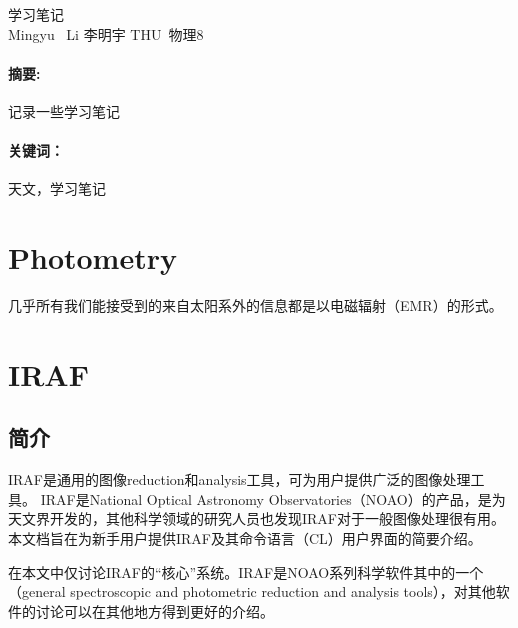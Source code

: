 \documentclass[CJK, utf8, GBK, oneside, a4paper, 12pt]{ctexart}
\newcommand{\myfiguresetwidthfilecaplabel}[4]{
    \centering
    \texttt{[image: ./images/\#2]}
    \captionsetup{font={footnotesize}}
    \caption{#3}
    \label{#4} }
\renewenvironment*{abstract}[1]{%
\newcommand\gjc{#1}
\paragraph{摘要:}
}{\paragraph{关键词：}\gjc }
\newcommand{\rd}{\mathrm{d}}
\newcommand{\dps}[1]{\displaystyle{#1}}
\begin{document}



\renewcommand\appendix{\setcounter{secnumdepth}{-2}}



\begin{center}
    \heiti{}学习笔记\\
    \kaishu{}Mingyu \ Li \qquad 李明宇 \qquad THU\  物理8
\end{center}

\begin{abstract}{天文，学习笔记}
    记录一些学习笔记
\end{abstract}
\tableofcontents
\newpage
\begin{comment}
\begin{equation}\dps{ v_g=\frac{\rd \omega}{\rd k}=\frac{c}{n+\omega\frac{\rd n}{\rd \omega}}}\end{equation}

\begin{figure}[!htbp]
    \myfiguresetwidthfilecaplabel{0.92}{1}{周期性阻抗同轴电缆示意图}{F1}
\end{figure}

\end{comment}
\section{Photometry}

几乎所有我们能接受到的来自太阳系外的信息都是以电磁辐射（EMR）的形式。


\section{IRAF}
\subsection{简介}
IRAF是通用的图像reduction和analysis工具，可为用户提供广泛的图像处理工具。 IRAF是National Optical Astronomy Observatories（NOAO）的产品，是为天文界开发的，其他科学领域的研究人员也发现IRAF对于一般图像处理很有用。本文档旨在为新手用户提供IRAF及其命令语言（CL）用户界面的简要介绍。

在本文中仅讨论IRAF的“核心”系统。IRAF是NOAO系列科学软件其中的一个（general spectroscopic and photometric reduction and analysis tools），对其他软件的讨论可以在其他地方得到更好的介绍。
\end{document}
